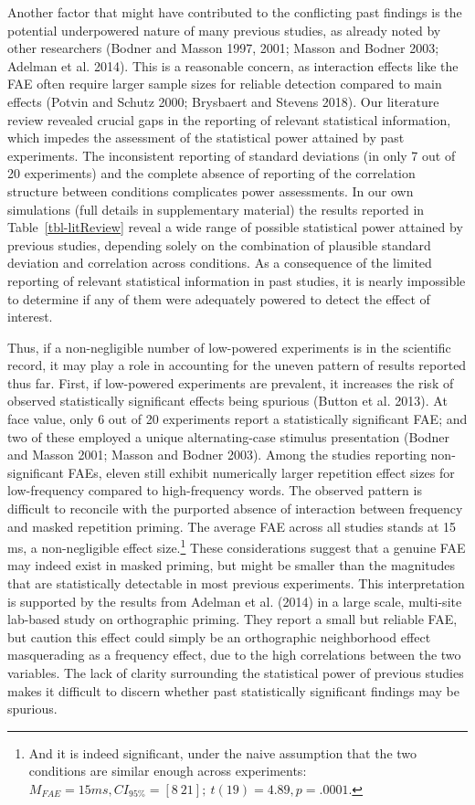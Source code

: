 \documentclass[
]{interact}
\begin{document}
Another factor that might have contributed to the conflicting past
findings is the potential underpowered nature of many previous studies,
as already noted by other researchers (Bodner and Masson 1997, 2001;
Masson and Bodner 2003; Adelman et al. 2014). This is a reasonable
concern, as interaction effects like the FAE often require larger sample
sizes for reliable detection compared to main effects (Potvin and Schutz
2000; Brysbaert and Stevens 2018). Our literature review revealed
crucial gaps in the reporting of relevant statistical information, which
impedes the assessment of the statistical power attained by past
experiments. The inconsistent reporting of standard deviations (in only
7 out of 20 experiments) and the complete absence of reporting of the
correlation structure between conditions complicates power assessments.
In our own simulations (full details in supplementary material) the
results reported in Table~\ref{tbl-litReview} reveal a wide range of
possible statistical power attained by previous studies, depending
solely on the combination of plausible standard deviation and
correlation across conditions. As a consequence of the limited reporting
of relevant statistical information in past studies, it is nearly
impossible to determine if any of them were adequately powered to detect
the effect of interest.

Thus, if a non-negligible number of low-powered experiments is in the
scientific record, it may play a role in accounting for the uneven
pattern of results reported thus far. First, if low-powered experiments
are prevalent, it increases the risk of observed statistically
significant effects being spurious (Button et al. 2013). At face value,
only 6 out of 20 experiments report a statistically significant FAE; and
two of these employed a unique alternating-case stimulus presentation
(Bodner and Masson 2001; Masson and Bodner 2003). Among the studies
reporting non-significant FAEs, eleven still exhibit numerically larger
repetition effect sizes for low-frequency compared to high-frequency
words. The observed pattern is difficult to reconcile with the purported
absence of interaction between frequency and masked repetition priming.
The average FAE across all studies stands at 15 ms, a non-negligible
effect size.\footnote{And it is indeed significant, under the naive
  assumption that the two conditions are similar enough across
  experiments:
  \(M_{FAE} = 15 ms, CI_{95\%} = [8 ~ 21];~t(19) = 4.89, p=.0001\).}
These considerations suggest that a genuine FAE may indeed exist in
masked priming, but might be smaller than the magnitudes that are
statistically detectable in most previous experiments. This
interpretation is supported by the results from Adelman et al. (2014) in
a large scale, multi-site lab-based study on orthographic priming. They
report a small but reliable FAE, but caution this effect could simply be
an orthographic neighborhood effect masquerading as a frequency effect,
due to the high correlations between the two variables. The lack of
clarity surrounding the statistical power of previous studies makes it
difficult to discern whether past statistically significant findings may
be spurious.
\end{document}
